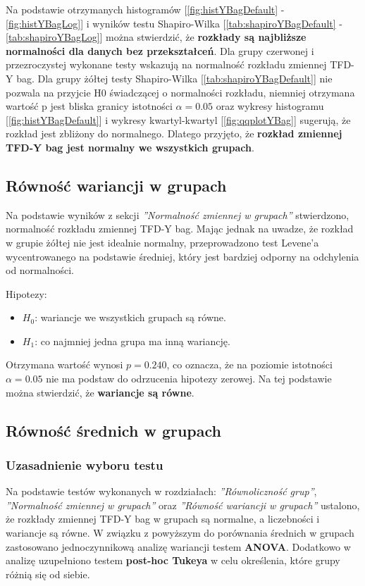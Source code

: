     Na podstawie otrzymanych histogramów [\ref{fig:histYBagDefault} - \ref{fig:histYBagLog}] i wyników testu Shapiro-Wilka 
    [\ref{tab:shapiroYBagDefault} - \ref{tab:shapiroYBagLog}] można stwierdzić, że \textbf{rozkłady są najbliższe normalności dla danych bez przekształceń}.
    Dla grupy czerwonej i przezroczystej wykonane testy wskazują na normalność rozkładu zmiennej TFD-Y bag.
    Dla grupy żółtej testy Shapiro-Wilka [\ref{tab:shapiroYBagDefault}] nie pozwala na przyjcie H0 świadczącej o normalności rozkładu,
    niemniej otrzymana wartość p jest bliska granicy istotności $\alpha=0.05$ oraz wykresy histogramu [\ref{fig:histYBagDefault}] i wykresy
    kwartyl-kwartyl [\ref{fig:qqplotYBag}] sugerują, że rozkład jest zbliżony do normalnego.
    Dlatego przyjęto, że \textbf{rozkład zmiennej TFD-Y bag jest normalny we wszystkich grupach}. 

    \subsection{Równość wariancji w grupach}
        Na podstawie wyników z sekcji \textit{''Normalność zmiennej w grupach''} stwierdzono, 
        normalność rozkładu zmiennej TFD-Y bag. Mając jednak na uwadze, że rozkład w grupie żółtej nie jest idealnie normalny, 
        przeprowadzono test Levene'a
        wycentrowanego na podstawie średniej, który jest bardziej odporny na odchylenia od normalności.

        Hipotezy:
        \begin{itemize}
            \item $H_0$: wariancje we wszystkich grupach są równe.
            \item $H_1$: co najmniej jedna grupa ma inną wariancję.
        \end{itemize}
        Otrzymana wartość wynosi $p=0.240$, co oznacza, że na poziomie istotności $\alpha=0.05$
        nie ma podstaw do odrzucenia hipotezy zerowej. Na tej podstawie można stwierdzić, że \textbf{wariancje są równe}.

    \subsection{Równość średnich w grupach}
        \subsubsection{Uzasadnienie wyboru testu}
        Na podstawie testów wykonanych w rozdziałach: \textit{''Równoliczność grup''}, 
        \textit{''Normalność zmiennej w grupach''} oraz \textit{''Równość wariancji w grupach''} ustalono, że rozkłady zmiennej TFD-Y bag
        w grupach są normalne, a liczebności i wariancje są równe. W związku z powyższym do porównania średnich
        w grupach zastosowano jednoczynnikową analizę wariancji testem \textbf{ANOVA}. Dodatkowo w analizę uzupełniono testem \textbf{post-hoc
        Tukeya} w celu określenia, które grupy różnią się od siebie.


